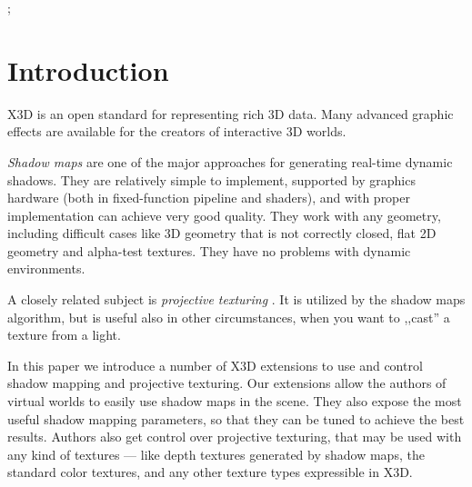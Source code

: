 \documentclass{acmsiggraph}                     %
\begin{document}
\begin{CRcatlist}
  ;
\end{CRcatlist}

\keywordlist


\section{Introduction}

\copyrightspace

X3D \cite{x3d:spec} is an open standard for representing rich 3D data.
Many advanced graphic effects are available for the creators of interactive
3D worlds.

\emph{Shadow maps} \cite{sm} are one of the major approaches for generating
real-time dynamic shadows. They are relatively simple to implement,
supported by graphics hardware (both in fixed-function pipeline and shaders),
and with proper implementation can achieve very good quality.
They work with any geometry, including difficult cases like
3D geometry that is not correctly closed,
flat 2D geometry and alpha-test textures.
They have no problems with dynamic environments.

A closely related subject is \emph{projective texturing} \cite{nvidia:proj}.
It is utilized by the shadow maps algorithm, but is useful also
in other circumstances, when you want to ,,cast'' a texture from a light.

In this paper we introduce a number of X3D extensions to
use and control shadow mapping and projective texturing.
Our extensions allow the authors of virtual worlds to easily use shadow maps
in the scene. They also expose the most useful shadow mapping parameters,
so that they can be tuned to achieve the best results.
Authors also get control over projective texturing, that may be used
with any kind of textures --- like depth textures generated by shadow maps,
the standard color textures, and any other texture types
expressible in X3D.
\end{document}
